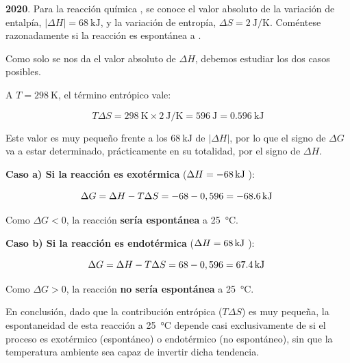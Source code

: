 \begin{exerciseEVAU}
    \textbf{2020}. Para la reacción química , se conoce el valor absoluto de la variación de entalpía, \(|\Delta H | = \SI{68}{\kilo\joule}\), y la variación de entropía, \(\Delta S = \SI{2}{\joule\per\kelvin}\).
    Coméntese razonadamente si la reacción es espontánea a .

    \begin{solu}

        Como solo se nos da el valor absoluto de \(\Delta H\), debemos estudiar los dos casos posibles.

        A \(T = \SI{298}{\kelvin}\), el término entrópico vale:

        \begin{equation*}
            T \Delta S = 298 \ \si{\kelvin} \times \SI{2}{\joule\per\kelvin} = \SI{596}{\joule} = \SI{0.596}{\kilo\joule}
        \end{equation*}

        Este valor es muy pequeño frente a los \(\SI{68}{\kilo\joule}\) de \(|\Delta H|\), por lo que el signo de \(\Delta G\) va a estar determinado, prácticamente en su totalidad, por el signo de \(\Delta H\).

        \textbf{Caso a) Si la reacción es exotérmica} (\(\Delta H = \energia[kj]{-68}\)):

        \begin{equation*}
            \Delta G = \Delta H - T \Delta S = -68 - 0,596 = \energia[kj]{-68.6}
        \end{equation*}

        Como \(\Delta G < 0\), la reacción \textbf{sería espontánea} a \SI{25}{\celsius}.

        \textbf{Caso b) Si la reacción es endotérmica} (\(\Delta H = \energia[kj]{68}\)):

        \begin{equation*}
            \Delta G = \Delta H - T \Delta S = 68 - 0,596 = \energia[kj]{67.4}
        \end{equation*}

        Como \(\Delta G > 0\), la reacción \textbf{no sería espontánea} a \SI{25}{\celsius}.

        En conclusión, dado que la contribución entrópica (\(T \Delta S\)) es muy pequeña, la espontaneidad de esta reacción a \SI{25}{\celsius} depende casi exclusivamente de si el proceso es exotérmico (espontáneo) o endotérmico (no espontáneo), sin que la temperatura ambiente sea capaz de invertir dicha tendencia.

    \end{solu}
\end{exerciseEVAU}

